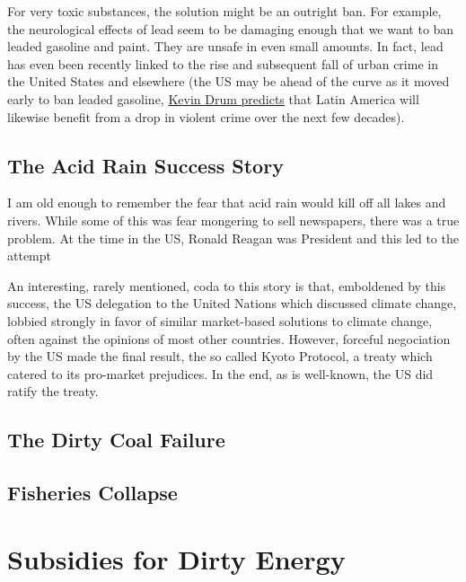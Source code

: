 For very toxic substances, the solution might be an outright ban. For example,
the neurological effects of lead seem to be damaging enough that we want to ban
leaded gasoline and paint. They are unsafe in even small amounts. In fact, lead
has even been recently linked to the rise and subsequent fall of urban crime in
the United States and elsewhere (the US may be ahead of the curve as it moved
early to ban leaded gasoline,
\href{http://www.motherjones.com/kevin-drum/2013/01/lead-and-crime-ill-be-melissa-harris-perry-show-sunday-10-am}{Kevin
Drum predicts} that Latin America will likewise benefit from a drop in violent
crime over the next few decades).

% 

\subsection{The Acid Rain Success Story}

I am old enough to remember the fear that acid rain would kill off all lakes
and rivers. While some of this was fear mongering to sell newspapers, there was
a true problem. At the time in the US, Ronald Reagan was President and this led
to the attempt

An interesting, rarely mentioned, coda to this story is that, emboldened by
this success, the US delegation to the United Nations which discussed climate
change, lobbied strongly in favor of similar market-based solutions to climate
change, often against the opinions of most other countries. However, forceful
negociation by the US made the final result, the so called Kyoto Protocol, a
treaty which catered to its pro-market prejudices. In the end, as is
well-known, the US did ratify the treaty.

\subsection{The Dirty Coal Failure}

\subsection{Fisheries Collapse}

\section{Subsidies for Dirty Energy}

